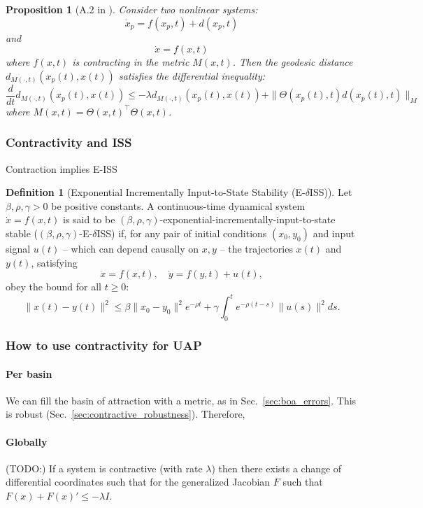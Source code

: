 \documentclass{article}
\newcommand{\ascomment}[1]{\textcolor{ascolor}{(#1)}}
\newtheorem{proposition}{Proposition}
\theoremstyle{definition} \newtheorem{definition}{Definition}
\theoremstyle{remark} \newtheorem{remark}{Remark}
\newcounter{ct}
\begin{document}
\begin{proposition}[A.2 in \citep{zhang2022adversarially}]
Consider two nonlinear systems:
\[
\dot{x}_p = f(x_p, t) + d(x_p, t)
\]
and 
\[
\dot{x} = f(x, t)
\]
where \( f(x, t) \) is contracting in the metric \( M(x,t) \).
 Then the geodesic distance \( d_{M(\cdot,t)}(x_p(t), x(t)) \) satisfies the differential inequality:
\[
\frac{d}{dt} d_{M(\cdot,t)}(x_p(t), x(t)) \leq -\lambda d_{M(\cdot,t)}(x_p(t), x(t)) + \|\Theta(x_p(t),t)d(x_p(t), t)\|_M
\]
where \( M(x,t) = \Theta(x,t)^\top \Theta(x,t) \).
\end{proposition}



\subsubsection{Contractivity and ISS}
Contraction implies E-ISS \citep{zhang2022adversarially}

\begin{definition}[Exponential Incrementally Input-to-State Stability (E-$\delta$ISS)]
Let \( \beta, \rho, \gamma > 0 \) be positive constants.
A continuous-time dynamical system  
\(\dot{x} = f(x, t)\)
is said to be \((\beta, \rho, \gamma)\)-exponential-incrementally-input-to-state stable (\((\beta, \rho, \gamma)\)-E-$\delta$ISS) if, for any pair of initial conditions \( (x_0, y_0) \) and input signal \( u(t) \) – which can depend causally on \( x, y \) – the trajectories \( x(t) \) and \( y(t) \), satisfying  
\[
\dot{x} = f(x, t), \quad \dot{y} = f(y, t) + u(t),
\]
obey the bound for all \( t \geq 0 \):
\[
\| x(t) - y(t) \|^2 \leq  \beta \| x_0 - y_0 \|^2 e^{- \rho t} + \gamma \int_0^t e^{-\rho (t-s)} \| u(s) \|^2 ds.
\]
\end{definition}


\subsubsection{How to use contractivity for UAP}
\paragraph{Per basin}
We can fill the basin of attraction with a metric, as in Sec.~\ref{sec:boa_errors}.
This is robust (Sec.~\ref{sec:contractive_robustness}).
Therefore, 


\paragraph{Globally}
\ascomment{TODO:}
If a system is contractive (with rate $\lambda$) then there exists a change of differential coordinates %
such that for the generalized Jacobian $F$ such that $F(x)+F (x)' \leq  -\lambda I$.
\end{document}

